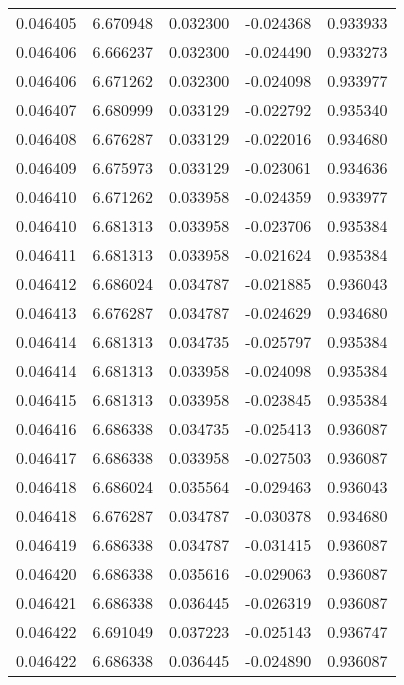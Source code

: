 \begin{tabular}{lrrrr}
0.046405    &  6.670948 &  0.032300 & -0.024368 &             0.933933 \\
0.046406    &  6.666237 &  0.032300 & -0.024490 &             0.933273 \\
0.046406    &  6.671262 &  0.032300 & -0.024098 &             0.933977 \\
0.046407    &  6.680999 &  0.033129 & -0.022792 &             0.935340 \\
0.046408    &  6.676287 &  0.033129 & -0.022016 &             0.934680 \\
0.046409    &  6.675973 &  0.033129 & -0.023061 &             0.934636 \\
0.046410    &  6.671262 &  0.033958 & -0.024359 &             0.933977 \\
0.046410    &  6.681313 &  0.033958 & -0.023706 &             0.935384 \\
0.046411    &  6.681313 &  0.033958 & -0.021624 &             0.935384 \\
0.046412    &  6.686024 &  0.034787 & -0.021885 &             0.936043 \\
0.046413    &  6.676287 &  0.034787 & -0.024629 &             0.934680 \\
0.046414    &  6.681313 &  0.034735 & -0.025797 &             0.935384 \\
0.046414    &  6.681313 &  0.033958 & -0.024098 &             0.935384 \\
0.046415    &  6.681313 &  0.033958 & -0.023845 &             0.935384 \\
0.046416    &  6.686338 &  0.034735 & -0.025413 &             0.936087 \\
0.046417    &  6.686338 &  0.033958 & -0.027503 &             0.936087 \\
0.046418    &  6.686024 &  0.035564 & -0.029463 &             0.936043 \\
0.046418    &  6.676287 &  0.034787 & -0.030378 &             0.934680 \\
0.046419    &  6.686338 &  0.034787 & -0.031415 &             0.936087 \\
0.046420    &  6.686338 &  0.035616 & -0.029063 &             0.936087 \\
0.046421    &  6.686338 &  0.036445 & -0.026319 &             0.936087 \\
0.046422    &  6.691049 &  0.037223 & -0.025143 &             0.936747 \\
0.046422    &  6.686338 &  0.036445 & -0.024890 &             0.936087 \\

\end{tabular}
